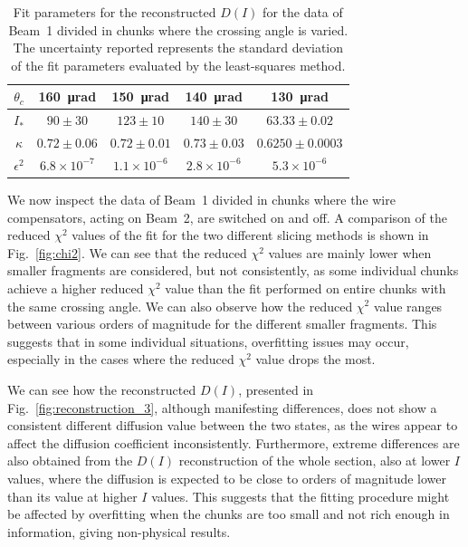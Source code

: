 \begin{table}[th]
    \centering
    \begin{tabular}{c|cccc}
        \toprule
        $\theta_c$ & \SI{160}{\micro\radian} & \SI{150}{\micro\radian} & \SI{140}{\micro\radian} & \SI{130}{\micro\radian} \\
        \midrule
        $I_\ast$ & $90\pm30$ & $123\pm10$ & $140\pm30$ & $63.33\pm0.02$ \\
        $\kappa$ & $0.72\pm0.06$ & $0.72\pm0.01$ & $0.73\pm0.03$ & $0.6250\pm0.0003$ \\
        $\epsilon^2$ & $6.8\times10^{-7}$ & $1.1\times10^{-6}$ & $2.8\times10^{-6}$ & $5.3\times10^{-6}$ \\
        \bottomrule
    \end{tabular}
    \caption{Fit parameters for the reconstructed $D(I)$ for the data of Beam~1 divided in chunks where the crossing angle is varied. The uncertainty reported represents the standard deviation of the fit parameters evaluated by the least-squares method.}
    \label{tab:reconstruction_2}
\end{table}


We now inspect the data of Beam~1 divided in chunks where the wire compensators, acting on Beam~2, are switched on and off. A comparison of the reduced $\chi^2$ values of the fit for the two different slicing methods is shown in Fig.~\ref{fig:chi2}. We can see that the reduced $\chi^2$ values are mainly lower when smaller fragments are considered, but not consistently, as some individual chunks achieve a higher reduced $\chi^2$ value than the fit performed on entire chunks with the same crossing angle. We can also observe how the reduced $\chi^2$ value ranges between various orders of magnitude for the different smaller fragments. This suggests that in some individual situations, overfitting issues may occur, especially in the cases where the reduced $\chi^2$ value drops the most.

We can see how the reconstructed $D(I)$, presented in Fig.~\ref{fig:reconstruction_3}, although manifesting differences, does not show a consistent different diffusion value between the two states, as the wires appear to affect the diffusion coefficient inconsistently. Furthermore, extreme differences are also obtained from the $D(I)$ reconstruction of the whole section, also at lower $I$ values, where the diffusion is expected to be close to orders of magnitude lower than its value at higher $I$ values. This suggests that the fitting procedure might be affected by overfitting when the chunks are too small and not rich enough in information, giving non-physical results.

